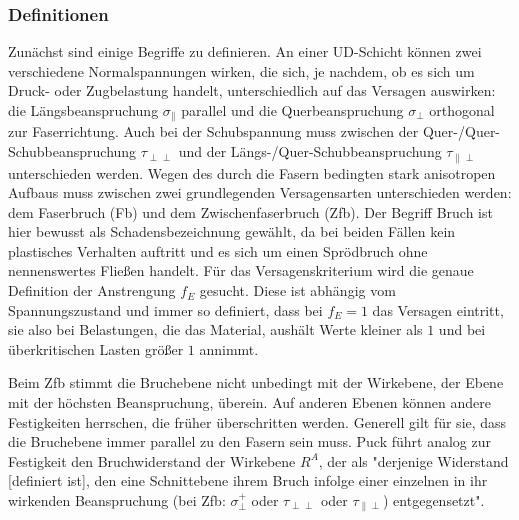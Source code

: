 \subsubsection{Definitionen}
Zunächst sind einige Begriffe zu definieren. An einer UD-Schicht können zwei verschiedene Normalspannungen wirken, die sich, je nachdem, ob es sich um Druck- oder Zugbelastung handelt, unterschiedlich auf das Versagen auswirken: die Längsbeanspruchung $\sigma_{\parallel}$ parallel und die Querbeanspruchung $\sigma_{\perp}$ orthogonal zur Faserrichtung. Auch bei der Schubspannung muss zwischen der Quer-/Quer-Schubbeanspruchung $\tau_{\perp\perp}$ und der Längs-/Quer-Schubbeanspruchung $\tau_{\parallel\perp}$ unterschieden werden. Wegen des durch die Fasern bedingten stark anisotropen Aufbaus muss zwischen zwei grundlegenden Versagensarten unterschieden werden: dem Faserbruch (Fb) und dem Zwischenfaserbruch (Zfb). Der Begriff Bruch ist hier bewusst als Schadensbezeichnung gewählt, da bei beiden Fällen kein plastisches Verhalten auftritt und es sich um einen Sprödbruch ohne nennenswertes Fließen handelt.
Für das Versagenskriterium wird die genaue Definition der Anstrengung $f_E$ gesucht. Diese ist abhängig vom Spannungszustand und immer so definiert, dass bei $f_E=1$ das Versagen eintritt, sie also bei Belastungen, die das Material, aushält Werte kleiner als $1$ und bei überkritischen Lasten größer $1$ annimmt.

\noindent Beim Zfb stimmt die Bruchebene nicht unbedingt mit der Wirkebene, der Ebene mit der höchsten Beanspruchung, überein. Auf anderen Ebenen können andere Festigkeiten herrschen, die früher überschritten werden. Generell gilt für sie, dass die Bruchebene immer parallel zu den Fasern sein muss. Puck führt analog zur Festigkeit den Bruchwiderstand der Wirkebene $R^A$, der als "derjenige Widerstand [definiert ist], den eine Schnittebene ihrem Bruch infolge einer einzelnen in ihr wirkenden Beanspruchung (bei Zfb: $\sigma_\perp^+$ oder $\tau_{\perp\perp}$ oder $\tau_{\parallel\perp}$) entgegensetzt"\cite{item3}.
